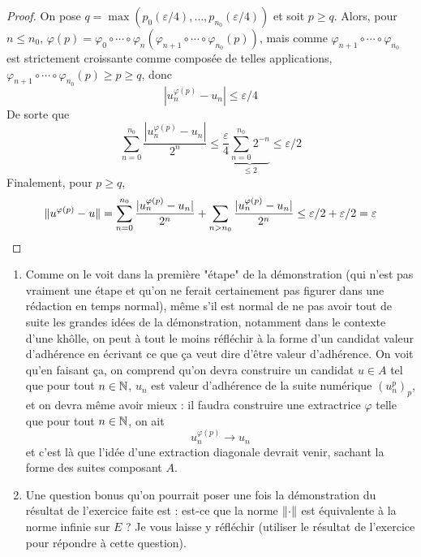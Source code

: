 \documentclass[10pt]{scrartcl}
\begin{document}
\begin{proof}
        On pose $q=\max(p_0(\varepsilon/4),\dots,p_{n_0}(\varepsilon/4))$ et soit $p\geq q$. Alors, pour $n\leq n_0$, $\varphi(p)=\varphi_0\circ\cdots\circ\varphi_n(\varphi_{n+1}\circ\cdots\circ\varphi_{n_0}(p))$, mais comme $\varphi_{n+1}\circ\cdots\circ\varphi_{n_0}$ est strictement croissante comme composée de telles applications, $\varphi_{n+1}\circ\cdots\circ\varphi_{n_0}(p)\geq p\geq q$, donc 
        \[
            |u^{\varphi(p)}_n-u_n|\leq\varepsilon/4
        \]
        De sorte que
        \[
            \sum_{n=0}^{n_0}\frac{|u^{\varphi(p)}_n-u_n|}{2^n}\leq \frac{\varepsilon}4\underbrace{\sum_{n=0}^{n_0}2^{-n}}_{\leq 2}\leq\varepsilon/2
        \]
        Finalement, pour $p\geq q$, 
        \[
            \lVert u^{\varphi(p)}-u\rVert=\sum_{n=0}^{n_0}\frac{|u^{\varphi(p)}_n-u_n|}{2^n}+\sum_{n>n_0}\frac{|u^{\varphi(p)}_n-u_n|}{2^n}\leq\varepsilon/2+\varepsilon/2=\varepsilon
        \]
    \end{proof}

    \begin{remarks}
        \begin{enumerate}
            \item Comme on le voit dans la première "étape" de la démonstration (qui n'est pas vraiment une étape et qu'on ne ferait certainement pas figurer dans une rédaction en temps normal), même s'il est normal de ne pas avoir tout de suite les grandes idées de la démonstration, notamment dans le contexte d'une khôlle, on peut à tout le moins réfléchir à la forme d'un candidat valeur d'adhérence en écrivant ce que ça veut dire d'être valeur d'adhérence. 
            On voit qu'en faisant ça, on comprend qu'on devra construire un candidat $u\in A$ tel que pour tout $n\in\operatorname{\mathbb N}$, $u_n$ est valeur d'adhérence de la suite numérique $(u^{p}_n)_p$, et on devra même avoir mieux : il faudra construire une extractrice $\varphi$ telle que pour tout $n\in\operatorname{\mathbb N}$, on ait 
            \[
                u_n^{\varphi(p)}\to u_n
            \]
            et c'est là que l'idée d'une extraction diagonale devrait venir, sachant la forme des suites composant $A$.
            \item Une question bonus qu'on pourrait poser une fois la démonstration du résultat de l'exercice faite est : est-ce que la norme $\lVert \cdot\rVert$ est équivalente à la norme infinie sur $E$ ? Je vous laisse y réfléchir (utiliser le résultat de l'exercice pour répondre à cette question).
        \end{enumerate}
    \end{remarks}
\end{document}
